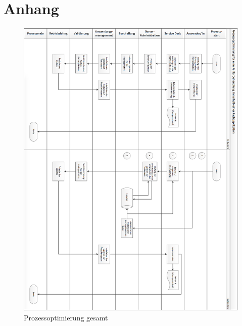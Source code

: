 \chapter*{Anhang}
\setcounter{chapter}{10}

\begin{figure}
	\centering
	\includegraphics[width=16cm]
	{kapitel/anhang/prozessoptimierung_gesamt_hoch}
	\caption{Prozessoptimierung gesamt}
	\label{fig_prozessoptimierung_gesamt}
\end{figure}

